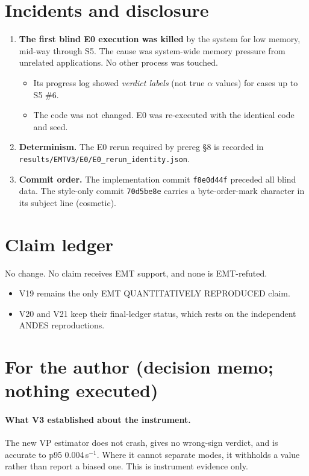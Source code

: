 \documentclass[10pt,a4paper]{article}
\newcommand{\sinv}{\,s$^{-1}$}
\newcommand{\f}[1]{\nolinkurl{#1}}
\begin{document}
\section{Incidents and disclosure}
\begin{enumerate}
\item \textbf{The first blind E0 execution was killed} by the system for low
  memory, mid-way through S5. The cause was system-wide memory pressure from
  unrelated applications. No other process was touched.
  \begin{itemize}
  \item Its progress log showed \emph{verdict labels} (not true $\alpha$
    values) for cases up to S5 \#6.
  \item The code was not changed. E0 was re-executed with the identical code
    and seed.
  \end{itemize}
\item \textbf{Determinism.} The E0 rerun required by prereg \S8 is recorded in
  \f{results/EMTV3/E0/E0_rerun_identity.json}.
\item \textbf{Commit order.} The implementation commit \texttt{f8e0d44f}
  preceded all blind data. The style-only commit \texttt{70d5be8e} carries a
  byte-order-mark character in its subject line (cosmetic).
\end{enumerate}

\section{Claim ledger}

No change. No claim receives EMT support, and none is EMT-refuted.
\begin{itemize}
\item V19 remains the only EMT QUANTITATIVELY REPRODUCED claim.
\item V20 and V21 keep their final-ledger status, which rests on the independent
  ANDES reproductions.
\end{itemize}

\section{For the author (decision memo; nothing executed)}

\paragraph{What V3 established about the instrument.} The new VP estimator does
not crash, gives no wrong-sign verdict, and is accurate to p95 0.004\sinv. Where
it cannot separate modes, it withholds a value rather than report a biased one.
This is instrument evidence only.
\end{document}
